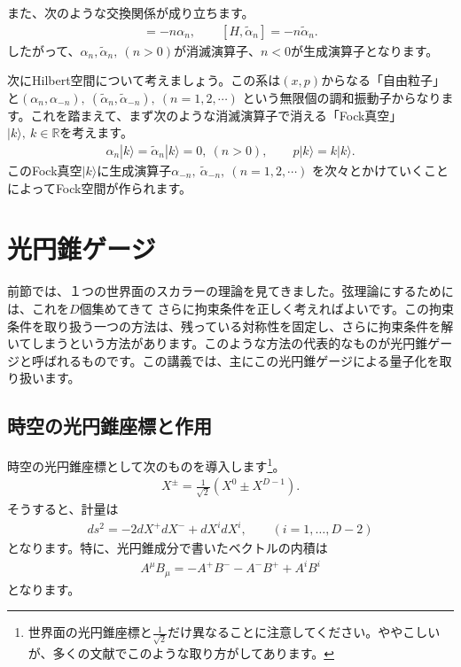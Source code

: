 \documentclass[report,paper=a4, fontsize=12pt, line_length=16cm, number_of_lines=33,dvipdfmx]{jlreq}
\numberwithin{equation}{chapter}
\numberwithin{equation}{section}
\newcommand{\Rb}{\mathbb{R}}
\newcommand{\alphat}{\tilde{\alpha}}
\begin{document}
また、次のような交換関係が成り立ちます。
\begin{align}
  [H,\alpha_{n}]=-n\alpha_{n},\qquad [H,\alphat_{n}]=-n\alphat_{n}.
\end{align}
したがって、$\alpha_{n},\alphat_{n},\ (n>0)$が消滅演算子、$n<0$が生成演算子となります。

次にHilbert空間について考えましょう。この系は$(x,p)$からなる「自由粒子」と$(\alpha_n,\alpha_{-n}), \ (\alphat_n,\alphat_{-n}),\ (n=1,2,\cdots)$ という無限個の調和振動子からなります。これを踏まえて、まず次のような消滅演算子で消える「Fock真空」$|k\rangle,\ k\in \Rb$を考えます。
\begin{align}
\alpha_n|k\rangle=\alphat_n|k\rangle=0, \ (n>0),\qquad p|k\rangle=k |k\rangle.
\end{align}
このFock真空$|k\rangle$に生成演算子$\alpha_{-n},\ \alphat_{-n},\ (n=1,2,\cdots)$ を次々とかけていくことによってFock空間が作られます。

\section{光円錐ゲージ}
前節では、１つの世界面のスカラーの理論を見てきました。弦理論にするためには、これを$D$個集めてきて
さらに拘束条件を正しく考えればよいです。この拘束条件を取り扱う一つの方法は、残っている対称性を固定し、さらに拘束条件を解いてしまうという方法があります。このような方法の代表的なものが光円錐ゲージと呼ばれるものです。この講義では、主にこの光円錐ゲージによる量子化を取り扱います。

\subsection{時空の光円錐座標と作用}
時空の光円錐座標として次のものを導入します\footnote{世界面の光円錐座標と$\frac{1}{\sqrt{2}}$だけ異なることに注意してください。ややこしいが、多くの文献でこのような取り方がしてあります。}。
\begin{align}
X^{\pm}=\frac{1}{\sqrt{2}} (X^0\pm X^{D-1}).
\end{align}
そうすると、計量は
\begin{align}
ds^2=-2dX^{+}dX^{-}+dX^{i}dX^{i},\qquad (i=1,\dots,D-2)
\end{align}
となります。特に、光円錐成分で書いたベクトルの内積は
\begin{align}
A^{\mu}B_{\mu}=-A^{+}B^{-}-A^{-}B^{+}+A^{i}B^{i}
\end{align}
となります。
\end{document}
